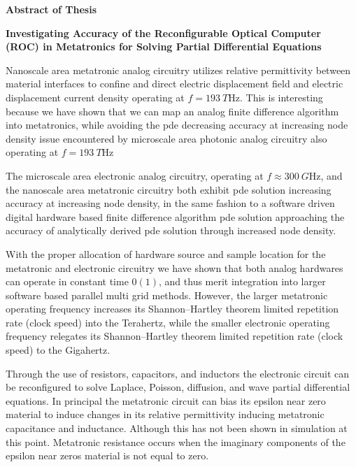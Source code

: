 \begin{center}
\textbf{Abstract of Thesis}
\begin{singlespace}
\textbf{Investigating Accuracy of the  Reconfigurable Optical Computer (ROC) in Metatronics for Solving Partial Differential Equations}
\end{singlespace}
\end{center}

\par Nanoscale area metatronic analog circuitry utilizes relative permittivity between material interfaces to confine and direct electric displacement field and electric displacement current density operating at $f = \SI{193}{T\hertz}$. This is interesting because we have shown that we can map an analog finite difference algorithm into metatronics, while avoiding the \acrfull{pde} decreasing accuracy at increasing node density issue encountered by microscale area photonic analog circuitry also operating at $f = \SI{193}{T\hertz}$ 

\par The microscale area electronic analog circuitry, operating at $f \approx \SI{300}{G\hertz}$, and the nanoscale area metatronic circuitry both exhibit \acrfull{pde} solution increasing accuracy at increasing node density, in the same fashion to a software driven digital hardware based finite difference algorithm \acrshort{pde} solution approaching the accuracy of analytically derived pde solution through increased node density.

\par With the proper allocation of hardware source and sample location for the metatronic and electronic circuitry we have shown that both analog hardwares can operate in constant time $0(1)$, and thus merit integration into larger software based parallel multi grid methods. However, the larger metatronic operating frequency increases its Shannon–Hartley theorem limited repetition rate (clock speed) into the Terahertz, while the smaller electronic operating frequency relegates its Shannon–Hartley theorem limited repetition rate (clock speed) to the Gigahertz.

\par Through the use of resistors, capacitors, and inductors the electronic circuit can be reconfigured to solve Laplace, Poisson, diffusion, and wave partial differential equations. In principal the metatronic circuit can bias its epsilon near zero material to induce changes in its relative permittivity inducing metatronic capacitance and inductance. Although this has not been shown in simulation at this point. Metatronic resistance occurs when the imaginary components of the epsilon near zeros material is not equal to zero.

